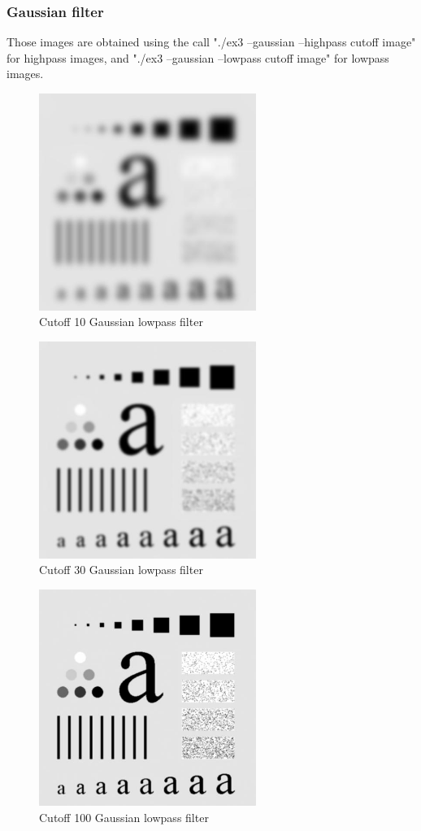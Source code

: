 \documentclass[10pt]{article}
\begin{document}
\subsubsection{Gaussian filter}
Those images are obtained using the call "./ex3 --gaussian --highpass cutoff image" for highpass images, and "./ex3 --gaussian --lowpass cutoff image" for lowpass images.
\begin{figure}[!ht]
	\centering
	\includegraphics[height=200pt]{./ex3/ch_gauss_low_10.jpg}
	\caption{Cutoff 10 Gaussian lowpass filter}
\end{figure}
\begin{figure}[!ht]
	\centering
	\includegraphics[height=200pt]{./ex3/ch_gauss_low_30.jpg}
	\caption{Cutoff 30 Gaussian lowpass filter}
\end{figure}
\begin{figure}[!ht]
	\centering
	\includegraphics[height=200pt]{./ex3/ch_gauss_low_100.jpg}
	\caption{Cutoff 100 Gaussian lowpass filter}
\end{figure}
\end{document}
